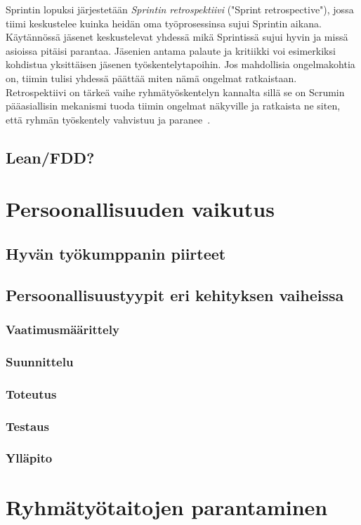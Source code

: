\documentclass[finnish]{../tktltiki2}
\theoremstyle{definition}
\theoremstyle{remark}
\begin{document}
Sprintin lopuksi järjestetään \emph{Sprintin retrospektiivi}
("Sprint retrospective"), jossa tiimi keskustelee kuinka heidän
oma työprosessinsa sujui Sprintin aikana. Käytännössä jäsenet
keskustelevat yhdessä mikä Sprintissä sujui hyvin ja missä
asioissa pitäisi parantaa. Jäsenien antama palaute ja kritiikki
voi esimerkiksi kohdistua yksittäisen jäsenen työskentelytapoihin.
Jos mahdollisia ongelmakohtia on, tiimin tulisi yhdessä päättää
miten nämä ongelmat ratkaistaan. Retrospektiivi on tärkeä vaihe
ryhmätyöskentelyn kannalta sillä se on Scrumin pääasiallisin
mekanismi tuoda tiimin ongelmat näkyville ja ratkaista ne siten,
että ryhmän työskentely vahvistuu ja paranee~\cite{Scrumprimer}.


\subsection{Lean/FDD?}

\section{Persoonallisuuden vaikutus}

\subsection{Hyvän työkumppanin piirteet}

\subsection{Persoonallisuustyypit eri kehityksen vaiheissa}

\subsubsection{Vaatimusmäärittely}
\subsubsection{Suunnittelu}
\subsubsection{Toteutus}
\subsubsection{Testaus}
\subsubsection{Ylläpito}

\section{Ryhmätyötaitojen parantaminen}


%
%
% 
%



\end{document}

